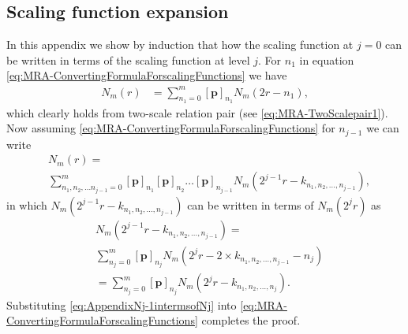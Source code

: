 \documentclass[review,authoryear,3p]{elsarticle}
\begin{document}
\subsection{Scaling function expansion}\label{ap:Induction}  
In this appendix we show by induction that how the scaling function at $j=0$ can be written in terms of the scaling function at level $j$. For $n_1$ in equation \eqref{eq:MRA-ConvertingFormulaForscalingFunctions} we have
\begin{align}
 N_{m}\left(r\right)&=\sum_{n_1=0}^{m} \left[\mathbf p\right]_{n_1} N_{m}\left(2r-n_1\right) \label{eq:App-TwoScalepair1},
  \end{align}
which clearly holds from two-scale relation pair (see \eqref{eq:MRA-TwoScalepair1}). Now assuming \eqref{eq:MRA-ConvertingFormulaForscalingFunctions} for $n_{j-1}$ we can write 
\begin{align}\label{eq:app-ConvertingFormulaForscalingFunctions}
 &N_m(r)=\nonumber \\
&\sum_{n_1,n_2, \dots n_{j-1}=0}^{m}\left[\mathbf p\right]_{n_1} \left[\mathbf p\right]_{n_2}\dots \left[\mathbf p\right]_{n_{j-1}}N_m(2^{j-1}r-k_{n_1,n_2, \dots, n_{j-1}}),
\end{align}
in which $N_m(2^{j-1}r-k_{n_1,n_2, \dots, n_{j-1}})$ can be written in terms of $N_m(2^{j}r)$ as
\begin{align}\label{eq:AppendixNj-1intermsofNj}
 &N_m(2^{j-1}r-k_{n_1,n_2, \dots, n_{j-1}})=\nonumber \\
&\sum_{n_j=0}^m \left[\mathbf p\right]_{n_j}N_m(2^jr-2\times k_{n_1,n_2, \dots, n_{j-1}}-n_j)\nonumber \\
&=\sum_{n_j=0}^m \left[\mathbf p\right]_{n_j}N_m(2^jr- k_{n_1,n_2, \dots, n_{j}}).
\end{align}
Substituting \eqref{eq:AppendixNj-1intermsofNj} into \eqref{eq:MRA-ConvertingFormulaForscalingFunctions} completes the proof. 
\end{document}
